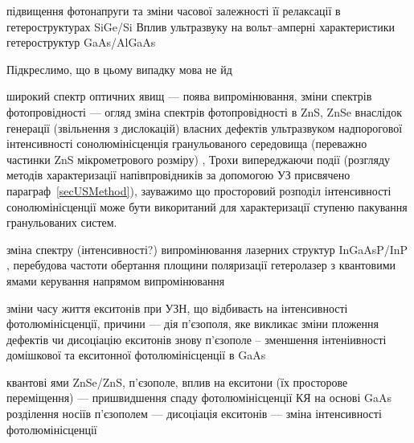 підвищення фотонапруги та зміни часової залежності її релаксації в гетероструктурах SiGe/Si \cite{Ostrovskii2001}
Вплив ультразвуку на вольт--амперні характеристики гетероструктур GaAs/AlGaAs \cite{Olikh:Visn2007}

Підкреслимо, що в цьому випадку мова не йд






широкий спектр оптичних явищ --- поява випромінювання, зміни спектрів фотопровідності --- огляд \cite{OstrBook,OSTROVSKII1999}
зміна спектрів фотопровідності в ZnS, ZnSe внаслідок генерації (звільнення з дислокацій) власних дефектів ультразвуком надпорогової інтенсивності \cite{OSTROVSKII1992}
сонолюмінісценція гранульованого середовища (переважно частинки ZnS мікрометрового розміру) \cite{KorotRep},
Трохи випереджаючи події (розгляду методів характеризації напівпровідників за допомогою УЗ присвячено параграф~\ref{secUSMethod}),
зауважимо що просторовий розподіл інтенсивності сонолюмінісценції може бути викоританий для характеризації ступеню пакування гранульованих систем\cite{KorotZnSdens}.


зміна спектру (інтенсивності?) випромінювання лазерних структур InGaAsP/InP \cite{Kulakova:09,KulacFTT2009,KulakJETF2007},
перебудова частоти \cite{KulakPJETF}
обертання площини поляризації гетеролазер з квантовими ямами \cite{Kulakova:2012SSC,KulakFTP2013}
керування напрямом випромінювання \cite{KulakPJTF2010}

зміни часу життя екситонів при УЗН, що відбиваєть на інтенсивності фотолюмінісценції,
причини --- дія п'єзополя, яке викликає зміни пложення дефектів чи дисоціацію екситонів \cite{KOROTCHENKOV1998,KorotchenAPL1998}
знову п'єзополе -- зменшення інтеніивності домішкової та екситонної фотолюмінісценції в GaAs \cite{Zhuravlev}




квантові ями ZnSe/ZnS, п'єзополе, вплив на екситони (їх просторове переміщення) --- пришвидшення спаду фотолюмінісценції \cite{KorotAPL1999,Ostrovskii2001}
КЯ на основі GaAs розділення носіїв п'єзополем --- дисоціація екситонів --- зміна інтенсивності фотолюмінісценції \cite{PhysRevLett78}

